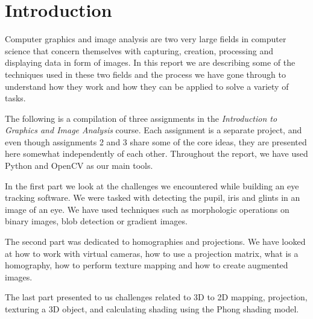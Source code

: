 \pagebreak
\section{Introduction}

Computer graphics and image analysis are two very large fields in computer science that concern themselves with capturing, creation, processing and displaying data in form of images. In this report we are describing some of the techniques used in these two fields and the process we have gone through to understand how they work and how they can be applied to solve a variety of tasks.

The following is a compilation of three assignments in the \textit{Introduction to Graphics and Image Analysis} course. Each assignment is a separate project, and even though assignments 2 and 3 share some of the core ideas, they are presented here somewhat independently of each other. Throughout the report, we have used Python and OpenCV as our main tools.

In the first part we look at the challenges we encountered while building an eye tracking software. We were tasked with detecting the pupil, iris and glints in an image of an eye. We have used techniques such as morphologic operations on binary images, blob detection or gradient images.

The second part was dedicated to homographies and projections. We have looked at how to work with virtual cameras, how to use a projection matrix, what is a homography, how to perform texture mapping and how to create augmented images.

The last part presented to us challenges related to 3D to 2D mapping, projection, texturing a 3D object, and calculating shading using the Phong shading model.